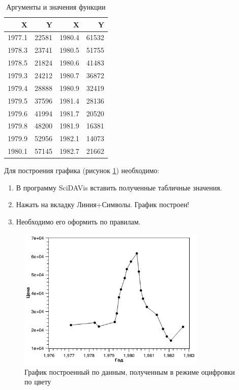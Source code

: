 \documentclass[a4paper,14pt,russian]{report}
\begin{document}
\begin{table}[!htb]
\centering
\caption{Аргументы и значения функции}
\label{table:custom-color}
\begin{tabular}{|r|r|r|r|}
  \hline
  X & Y & X & Y \\
  \hline
  1977.1 & 22581 & 1980.4 & 61532 \\
  1978.3 & 23741 & 1980.5 & 51755 \\
  1978.5 & 21824 & 1980.6 & 41483 \\
  1979.3 & 24212 & 1980.7 & 36872 \\
  1979.4 & 28888 & 1980.9 & 32419 \\
  1979.5 & 37596 & 1981.4 & 28136 \\
  1979.6 & 41994 & 1981.7 & 20520 \\
  1979.8 & 48200 & 1981.9 & 16381 \\
  1979.9 & 52956 & 1982.1 & 14073 \\
  1980.1 & 57145 & 1982.7 & 21662 \\
  \hline
\end{tabular}
\end{table}

Для построения графика (рисунок \ref{graph:custom-color}) необходимо:

\begin{enumerate}
  \item В программу SciDAVis вставить полученные табличные значения.
  \item Нажать на вкладку Линия+Символы. График построен!
  \item Необходимо его оформить по правилам.
\end{enumerate}

\begin{figure}[!htb]
  \centerline{\includegraphics[width=0.8\textwidth]{graph-custom-color}}
  \caption{График построенный по данным, полученным в режиме оцифровки по цвету}
  \label{graph:custom-color}
\end{figure}
\end{document}
